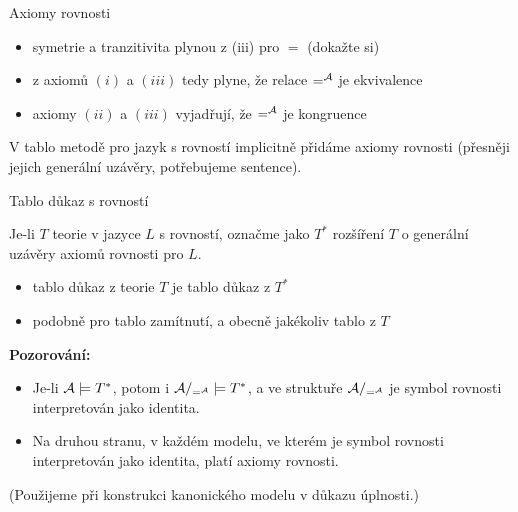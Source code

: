 \documentclass{beamer}
\begin{document}
\begin{frame}{Axiomy rovnosti}


    \begin{itemize}
        \item symetrie a tranzitivita plynou z (iii) pro $=$ (dokažte si)
        \item z axiomů $(i)$ a $(iii)$ tedy plyne, že relace $=^{\mathcal{A}}$ je ekvivalence
        \item axiomy $(ii)$ a $(iii)$ vyjadřují, že $=^{\mathcal{A}}$ je kongruence
    \end{itemize}

    V tablo metodě pro jazyk s rovností implicitně přidáme axiomy rovnosti (přesněji jejich generální uzávěry, potřebujeme sentence).

\end{frame}


\begin{frame}{Tablo důkaz s rovností}

    Je-li $T$ teorie v jazyce $L$ s rovností, označme jako $T^*$ rozšíření $T$ o generální uzávěry axiomů rovnosti pro $L$. 
    
    \begin{itemize}
        \item \alert{tablo důkaz} z teorie $T$ je \alert{tablo důkaz} z $T^*$
        \item podobně pro tablo zamítnutí, a obecně jakékoliv tablo z $T$
    \end{itemize}
 
    \textbf{Pozorování:}
    \begin{itemize}
        \item Je-li $\mathcal{A}\models T^*$, potom i $\mathcal{A}/_{=^{\mathcal{A}}}\models T^*$, a ve struktuře $\mathcal{A}/_{=^{\mathcal{A}}}$ je symbol rovnosti interpretován jako identita.
        \item Na druhou stranu, v každém modelu, ve kterém je symbol rovnosti interpretován jako identita, platí axiomy rovnosti.
    \end{itemize}
     
    (Použijeme při konstrukci \alert{kanonického modelu} v důkazu úplnosti.)

\end{frame}
\end{document}
